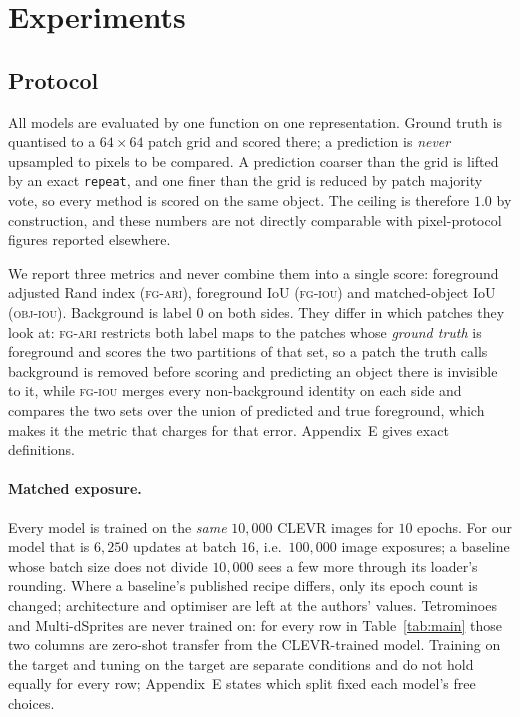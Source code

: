 \section{Experiments}
\label{sec:experiments}

\subsection{Protocol}
\label{sec:protocol}

All models are evaluated by one function on one representation. Ground truth is quantised to a
$64\times64$ patch grid and scored there; a prediction is \emph{never} upsampled to pixels to be
compared. A prediction coarser than the grid is lifted by an exact \texttt{repeat}, and one finer
than the grid is reduced by patch majority vote, so every method is scored on the same object. The
ceiling is therefore $1.0$ by construction, and these numbers are not directly comparable with
pixel-protocol figures reported elsewhere.

We report three metrics and never combine them into a single score: foreground adjusted Rand index
(\textsc{fg-ari}), foreground IoU (\textsc{fg-iou}) and matched-object IoU (\textsc{obj-iou}).
Background is label $0$ on both sides. They differ in which patches they look at:
\textsc{fg-ari} restricts both label maps to the patches whose \emph{ground truth} is foreground
and scores the two partitions of that set, so a patch the truth calls background is removed
before scoring and predicting an object there is invisible to it, while \textsc{fg-iou} merges
every non-background identity on each side and compares the two sets over the union of predicted
and true foreground, which makes it the metric that charges for that error. Appendix~E gives
exact definitions.

\paragraph{Matched exposure.}
Every model is trained on the \emph{same} $10{,}000$ CLEVR images for $10$ epochs. For our model
that is $6{,}250$ updates at batch $16$, i.e.\ $100{,}000$ image exposures; a baseline whose batch
size does not divide $10{,}000$ sees a few more through its loader's rounding. Where a baseline's
published recipe differs, only its epoch count is changed; architecture and optimiser are left at
the authors' values. Tetrominoes and Multi-dSprites are never trained on: for every row in
Table~\ref{tab:main} those two columns are zero-shot transfer from the CLEVR-trained model.
Training on the target and tuning on the target are separate conditions and do not hold equally
for every row; Appendix~E states which split fixed each model's free choices.

